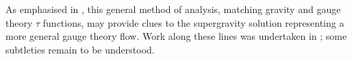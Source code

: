 \documentclass[a4paper,12pt]{amsproc}
\numberwithin{equation}{section}
\def\ls{\ell_{\rm{s}}}
\begin{document}
As emphasised in \cite{bpp}, this general method of analysis, matching
gravity and gauge theory $\tau$ functions, may provide clues to the
supergravity solution representing a more general gauge theory flow.
Work along these lines was undertaken in \cite{evansplus2}; some
subtleties remain to be understood.


%
%
%
%
\end{document}
